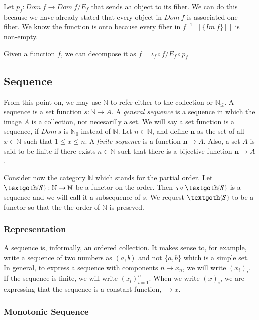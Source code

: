 \documentclass [12pt]{book}
\begin{document}
Let $p_f:Dom~f\rightarrow Dom~f/E_f$ that sends an object to its fiber. We can do this because we have already stated that every object in $Dom~f$ is associated one fiber. We know the function is onto because every fiber in $f^{-1}[[\{Im~f\}]]$ is non-empty.

\begin{theorem}Given a function $f$, we can decompose it as $f=\iota_f\circ f/E_f\circ p_f$\end{theorem}

	\subsection{Sequence}

From this point on, we may use $\mathbb N$ to refer either to the collection or $\mathbb N_{\leq}$. A sequence is a set function $s:\mathbb{N}\rightarrow A$. A \textit{general sequence} is a sequence in which the image $A$ is a collection, not necesarilly a set. We will say a set function is a sequence, if $Dom~s$ is $\mathbb{N}_{0}$ instead of $\mathbb{N}$. Let $n\in\mathbb{N}$, and define $\textbf{n}$ as the set of all $x\in\mathbb{N}$ such that $1\leq x\leq n$. A \textit{finite sequence} is a function $\textbf{n}\rightarrow A$. Also, a set $A$ is said to be finite if there exists $n\in\mathbb{N}$ such that there is a bijective function $\textbf{n}\rightarrow A$.

Consider now the category $\mathbb{N}$ which stands for the partial order. Let $\textgoth{S}:\mathbb{N}\rightarrow\mathbb{N}$ be a functor on the order. Then $s\circ\textgoth{S}$ is a sequence and we will call it a subsequence of 
$s$. We request $\textgoth{S}$ to be a functor so that the the order of $\mathbb{N}$ is preseved.

		\subsubsection{Representation}

A sequence is, informally, an ordered collection. It makes sense to, for example, write a sequence of two numbers as $(a,b)$ and not $\{a,b\}$ which is a simple set. In general, to express a sequence with components $n\mapsto x_n$, we will write $(x_i)_i$. If the sequence is finite, we will write $(x_i)_{i=1}^n$. When we write $(x)_{i}$, we are expressing that the sequence is a constant function, $\rightarrow x$.

		\subsubsection{Monotonic Sequence}
\end{document}
